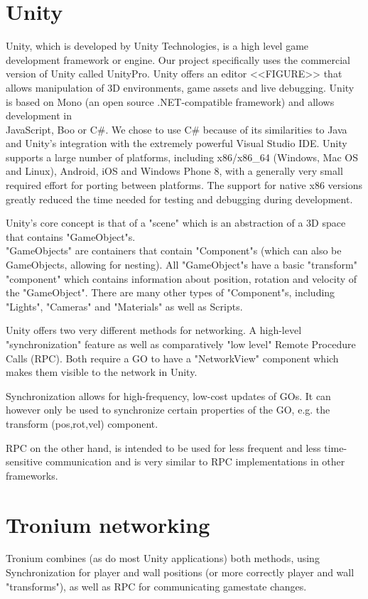 \documentclass{report}
\begin{document}
\section{Unity}
Unity\textregistered, which is developed by Unity Technologies, is a high level game development framework or engine. Our project specifically uses the commercial version of Unity called Unity\textregistered Pro. Unity offers an editor  <<FIGURE>> that allows manipulation of 3D environments, game assets and live debugging.
Unity is based on Mono (an open source .NET-compatible framework) and allows development in \\ JavaScript, Boo or C\#. 
We chose to use C\# because of its similarities to Java and Unity's integration with the extremely powerful Visual Studio IDE.
Unity supports a large number of platforms, including x86/x86\_64 (Windows, Mac OS and Linux), Android, iOS and Windows Phone 8, with a generally very small required effort for porting between platforms.
The support for native x86 versions greatly reduced the time needed for testing and debugging during development.

Unity's core concept is that of a "scene" which is an abstraction of a 3D space that contains "GameObject"s.
\\ "GameObjects" are containers that contain "Component"s (which can also be GameObjects, allowing for nesting).
All "GameObject"s have a basic "transform" "component" which contains information about position, rotation and velocity of the "GameObject". There are many other types of "Component"s, including "Lights", "Cameras" and "Materials" as well as Scripts.

Unity offers two very different methods for networking.
A high-level "synchronization" feature as well as comparatively "low level"  Remote Procedure Calls (RPC).
Both require a GO to have a "NetworkView" component which makes them visible to the network in Unity.

Synchronization allows for high-frequency, low-cost updates  of GOs. It can however only be used to synchronize certain properties of the GO, e.g. the transform (pos,rot,vel) component.

RPC on the other hand, is intended to be used for less frequent and less time-sensitive communication and is very similar to RPC implementations in other frameworks.

\section{Tronium networking}
Tronium combines (as do most Unity applications) both methods, using Synchronization for player and wall positions (or more correctly player and wall "transforms"), as well as RPC for communicating gamestate changes.
\end{document}

